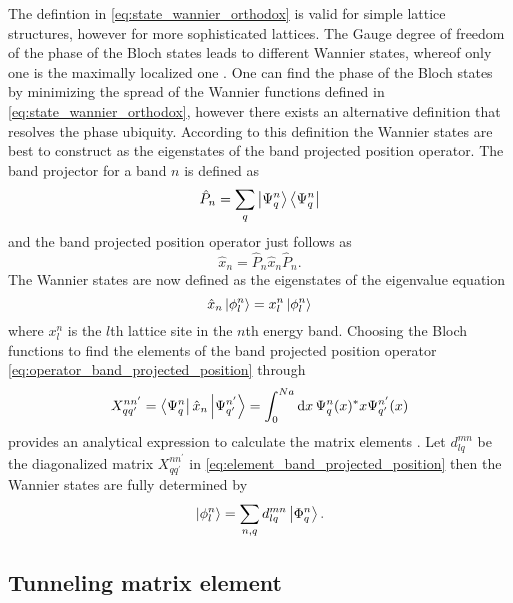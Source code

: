 The defintion in \cref{eq:state_wannier_orthodox} is valid for simple lattice
structures, however for more sophisticated lattices. The Gauge degree of
freedom of the phase of the Bloch states leads to different Wannier states,
whereof only one is the maximally localized one \cite{Goerg2014}. One can find
the phase of the Bloch states by minimizing the spread of the Wannier
functions defined in \cref{eq:state_wannier_orthodox}, however there exists
an alternative definition that resolves the phase ubiquity. According to this
definition the Wannier states are best to construct as the eigenstates of the band projected
position operator. The band projector for a band $n$ is defined as
\begin{equation}
  \hat{P}_n
  =\sum_q\ket{\Psi^n_q}\bra{\Psi^n_q}
  \label{eq:operator_band_projector}
\end{equation}
and the band projected position operator just follows as
\begin{equation}
  \hat{x}_n
  =\hat{P}_n\hat{x}_n\hat{P}_n
  \label{eq:operator_band_projected_position}.
\end{equation}
The Wannier states are now defined as the eigenstates of the eigenvalue
equation
\begin{equation}
  \hat{x}_n\ket{\phi^n_l}=x^n_l\ket{\phi^n_l}
  \label{eq:eigenvalue_band_projected_position}
\end{equation}
where $x^n_l$ is the $l$th lattice site in the $n$th energy band. Choosing
the Bloch functions to find the elements of the band projected position
operator \cref{eq:operator_band_projected_position} through
\begin{equation}
  X^{nn^\prime}_{qq^\prime}
  =\bra{\Psi^n_q}\hat{x}_n\ket{\Psi^{n^\prime}_{q^\prime}}
  =\int_0^{Na}\dd{x}\Psi^n_q(x)^*x\Psi^{n^\prime}_{q^\prime}(x)
  \label{eq:element_band_projected_position}
\end{equation}
provides an analytical expression to calculate the matrix elements
\cite{Bissbort2013}. Let $d^{mn}_{lq}$ be the diagonalized
matrix $X^{nn^\prime}_{qq^\prime}$ in
\cref{eq:element_band_projected_position} then the Wannier states are fully
determined by
\begin{equation}
  \ket{\phi^n_l}
  =\sum_{n,q}d^{mn}_{lq}\ket{\Phi^n_q}
  \label{eq:state_wannier}.
\end{equation}

\subsection{Tunneling matrix element}

